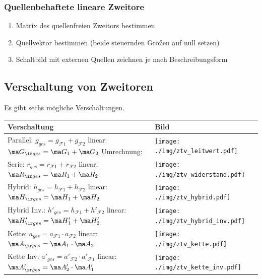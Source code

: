 \documentclass[fs, footer]{latex4ei}
\begin{document}
\begin{multicols*}{4}
    \subsubsection{Quellenbehaftete lineare Zweitore}
    \begin{enumerate}\itemsep0pt
        \item Matrix des quellenfreien Zweitors bestimmen
        \item Quellvektor bestimmen (beide steuernden Größen auf null setzen)
        \item Schaltbild mit externen Quellen zeichnen je nach Beschreibungsform
    \end{enumerate}



    \subsection{Verschaltung von Zweitoren}
    Es gibt sechs mögliche Verschaltungen.\\
    \begin{tabular}{@{}ll}
        Verschaltung & Bild                                                        \\ \hline
        \parbox{3cm}{Parallel: $g_{ges}=g_{\mathcal F1}+g_{\mathcal F2}$           \\ linear: $\ma G_{\ir ges} = \ma G_1 + \ma G_2$ \\ Umrechnung: } & \parbox{2.5cm}{\texttt{[image: ./img/ztv\_leitwert.pdf]}}\\[2em]
        \parbox{3cm}{Serie: $r_{ges}=r_{\mathcal F1}+r_{\mathcal F2}$              \\ linear: $\ma R_{\ir ges} = \ma R_1 + \ma R_2$} & \parbox{2.5cm}{\texttt{[image: ./img/ztv\_widerstand.pdf]}}\\[2em]
        \parbox{3cm}{Hybrid: $h_{ges}=h_{\mathcal F1}+h_{\mathcal F2}$             \\ linear: $\ma H_{\ir ges} = \ma H_1 + \ma H_2$} & \parbox{2.5cm}{\texttt{[image: ./img/ztv\_hybrid.pdf]}}\\[2em]
        \parbox{3.5cm}{Hybrid Inv.: $h'_{ges}=h_{\mathcal F1}+h'_{\mathcal F2}$    \\ linear: $\ma H'_{\ir ges} = \ma H'_1 + \ma H'_2$} & \parbox{2.5cm}{\texttt{[image: ./img/ztv\_hybrid\_inv.pdf]}}\\[2em]
        \parbox{3cm}{Kette: $a_{ges}=a_{\mathcal F1} \cdot a_{\mathcal F2}$        \\ linear: $\ma A_{\ir ges} = \ma A_1 \cdot \ma A_2$} & \parbox{2.5cm}{\texttt{[image: ./img/ztv\_kette.pdf]}}\\[2em]
        \parbox{3cm}{Kette Inv: $a'_{ges}=a'_{\mathcal F2} \cdot a'_{\mathcal F1}$ \\ linear: $\ma A'_{\ir ges} = \ma A'_2 \cdot \ma A'_1$} & \parbox{2.5cm}{\texttt{[image: ./img/ztv\_kette\_inv.pdf]}}\\
    \end{tabular}


\end{multicols*}
\end{document}

